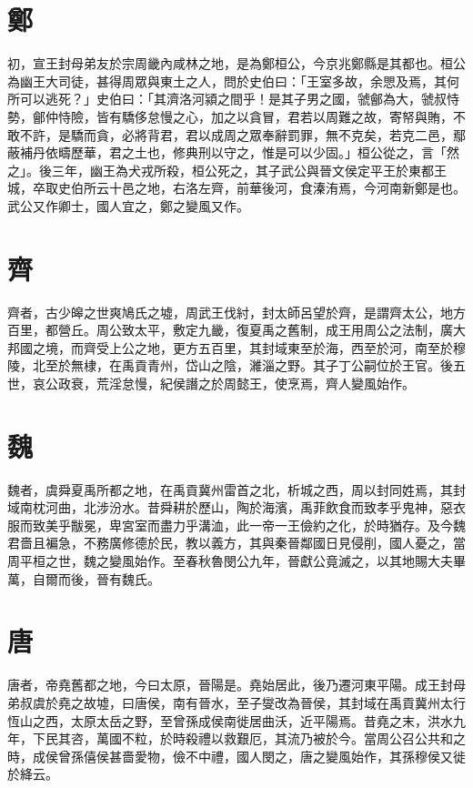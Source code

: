 \section*{鄭}

初，宣王封母弟友於宗周畿內咸林之地，是為鄭桓公，今京兆鄭縣是其都也。桓公為幽王大司徒，甚得周眾與東土之人，問於史伯曰：「王室多故，余愳及焉，其何所可以逃死？」史伯曰：「其濟洛河潁之間乎！是其子男之國，虢鄶為大，虢叔恃勢，鄶仲恃險，皆有驕侈怠慢之心，加之以貪冒，君若以周難之故，寄帑與賄，不敢不許，是驕而貪，必將背君，君以成周之眾奉辭罰罪，無不克矣，若克二邑，鄢蔽補丹依疇歷華，君之土也，修典刑以守之，惟是可以少固。」桓公從之，言「然之」。後三年，幽王為犬戎所殺，桓公死之，其子武公與晉文侯定平王於東都王城，卒取史伯所云十邑之地，右洛左齊，前華後河，食溱洧焉，今河南新鄭是也。武公又作卿士，國人宜之，鄭之變風又作。

\section*{齊}

齊者，古少皞之世爽鳩氏之墟，周武王伐紂，封太師呂望於齊，是謂齊太公，地方百里，都營丘。周公致太平，敷定九畿，復夏禹之舊制，成王用周公之法制，廣大邦國之境，而齊受上公之地，更方五百里，其封域東至於海，西至於河，南至於穆陵，北至於無棣，在禹貢青州，岱山之陰，濰淄之野。其子丁公嗣位於王官。後五世，哀公政衰，荒淫怠慢，紀侯譖之於周懿王，使烹焉，齊人變風始作。

\section*{魏}

魏者，虞舜夏禹所都之地，在禹貢冀州雷首之北，析城之西，周以封同姓焉，其封域南枕河曲，北涉汾水。昔舜耕於歷山，陶於海濱，禹菲飲食而致孝乎鬼神，惡衣服而致美乎黻冕，卑宮室而盡力乎溝洫，此一帝一王儉約之化，於時猶存。及今魏君嗇且褊急，不務廣修德於民，教以義方，其與秦晉鄰國日見侵削，國人憂之，當周平桓之世，魏之變風始作。至春秋魯閔公九年，晉獻公竟滅之，以其地賜大夫畢萬，自爾而後，晉有魏氏。

\section*{唐}

唐者，帝堯舊都之地，今曰太原，晉陽是。堯始居此，後乃遷河東平陽。成王封母弟叔虞於堯之故墟，曰唐侯，南有晉水，至子燮改為晉侯，其封域在禹貢冀州太行恆山之西，太原太岳之野，至曾孫成侯南徙居曲沃，近平陽焉。昔堯之末，洪水九年，下民其咨，萬國不粒，於時殺禮以救艱厄，其流乃被於今。當周公召公共和之時，成侯曾孫僖侯甚嗇愛物，儉不中禮，國人閔之，唐之變風始作，其孫穆侯又徙於絳云。

